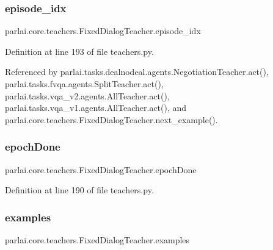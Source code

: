 \subsubsection{\texorpdfstring{episode\+\_\+idx}{episode\_idx}}
{\footnotesize\ttfamily parlai.\+core.\+teachers.\+Fixed\+Dialog\+Teacher.\+episode\+\_\+idx}



Definition at line 193 of file teachers.\+py.



Referenced by parlai.\+tasks.\+dealnodeal.\+agents.\+Negotiation\+Teacher.\+act(), parlai.\+tasks.\+fvqa.\+agents.\+Split\+Teacher.\+act(), parlai.\+tasks.\+vqa\+\_\+v2.\+agents.\+All\+Teacher.\+act(), parlai.\+tasks.\+vqa\+\_\+v1.\+agents.\+All\+Teacher.\+act(), and parlai.\+core.\+teachers.\+Fixed\+Dialog\+Teacher.\+next\+\_\+example().

\mbox{\label{classparlai_1_1core_1_1teachers_1_1FixedDialogTeacher_a2fec0a004a2ea81402a66244c62b8607}} 
\subsubsection{\texorpdfstring{epoch\+Done}{epochDone}}
{\footnotesize\ttfamily parlai.\+core.\+teachers.\+Fixed\+Dialog\+Teacher.\+epoch\+Done}



Definition at line 190 of file teachers.\+py.

\mbox{\label{classparlai_1_1core_1_1teachers_1_1FixedDialogTeacher_a95eb8aeb051fc81a10ac7e1a7d5fed3d}} 
\subsubsection{\texorpdfstring{examples}{examples}}
{\footnotesize\ttfamily parlai.\+core.\+teachers.\+Fixed\+Dialog\+Teacher.\+examples}



